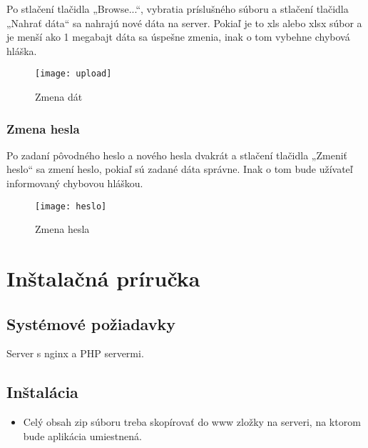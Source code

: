 \documentclass[12pt,a4paper]{report}
\begin{document}
Po stlačení tlačidla „Browse...“, vybratia príslušného súboru a stlačení tlačidla „Nahrať dáta“ sa nahrajú nové dáta na server. Pokiaľ je to xls alebo xlsx súbor a je menší ako 1 megabajt dáta sa úspešne zmenia, inak o tom vybehne chybová hláška.

\begin{figure}[htb]
	\centering
	\texttt{[image: upload]}
	\caption{Zmena dát}
	\label{fig:Zmena dát}
\end{figure}

\subsection[Zmena hesla]{\rmfamily\bfseries
	Zmena hesla}

Po zadaní pôvodného heslo a nového hesla dvakrát a stlačení tlačidla „Zmeniť heslo“ sa zmení heslo, pokiaľ sú zadané dáta správne. Inak o tom bude užívateľ informovaný chybovou hláškou.

\begin{figure}[htb]
	\centering
	\texttt{[image: heslo]}
	\caption{Zmena hesla}
	\label{fig:Zmena hesla}
\end{figure}


\renewcommand{\chaptername}{}	
\chapter[Inštalačná príručka]{\rmfamily\bfseries
	Inštalačná príručka}

\section[Systémové požiadavky]{\rmfamily\bfseries
	Systémové požiadavky}
Server s nginx a PHP servermi.

\section[Inštalácia]{\rmfamily\bfseries
	Inštalácia}
\begin{itemize}
	\item Celý obsah zip súboru treba skopírovať do www zložky na serveri, na ktorom bude aplikácia umiestnená.
\end{itemize}
\end{document}
